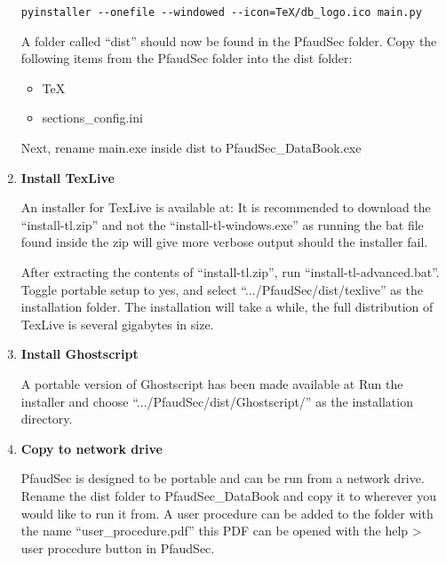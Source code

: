 \documentclass[14pt]{article}
\newcommand{\chref}[3][black]{\href{#2}{\color{#1}{#3}}}%
\newcommand{\ifolder}{\item[\faFolderOpen]}
\newcommand{\ifile}{\item[\faFileText]}
\begin{document}
\begin{flushleft}
\begin{enumerate}
\begin{tcolorbox}[
boxrule=0.5pt,
colback=backgrey,
colframe=bordergrey,
sharpish corners] 
\begin{verbatim}
pyinstaller --onefile --windowed --icon=TeX/db_logo.ico main.py
\end{verbatim}
\end{tcolorbox}
A folder called ``dist'' should now be found in the PfaudSec folder.
Copy the following items from the PfaudSec folder into the dist folder:

\begin{tcolorbox}[
boxrule=0.5pt,
colback=backgrey,
colframe=bordergrey,
sharpish corners] 
\begin{itemize}[labelsep = 1.5em, align=center]%

\ifolder TeX
\ifile sections\_config.ini

\end{itemize}
\end{tcolorbox}

Next, rename main.exe inside dist to PfaudSec\_DataBook.exe

\item \textbf{Install TexLive}

An installer for TexLive is available at:
\chref[pfblue]{https://www.tug.org/texlive/acquire-netinstall.html}{https://www.tug.org/texlive/acquire-netinstall.html}
It is recommended to download the ``install-tl.zip'' and not the ``install-tl-windows.exe'' as running the bat file found inside the zip will give more verbose output should the installer fail.

After extracting the contents of ``install-tl.zip'', run ``install-tl-advanced.bat''.
Toggle portable setup to yes, and select ``.../PfaudSec/dist/texlive'' as the installation folder.
The installation will take a while, the full distribution of TexLive is several gigabytes in size.

\item \textbf{Install Ghostscript}

A portable version of Ghostscript has been made available at \chref[pfblue]{https://portableapps.com/apps/utilities/ghostscript_portable}{https://portableapps.com/apps/utilities/ghostscript\_portable}
Run the installer and choose ``.../PfaudSec/dist/Ghostscript/'' as the installation directory.

\item \textbf{Copy to network drive}

PfaudSec is designed to be portable and can be run from a network drive.
Rename the dist folder to PfaudSec\_DataBook and copy it to wherever you would like to run it from.
A user procedure can be added to the folder with the name ``user\_procedure.pdf'' this PDF can be opened with the help > user procedure button in PfaudSec.


\end{enumerate}
\end{flushleft}
\end{document}
